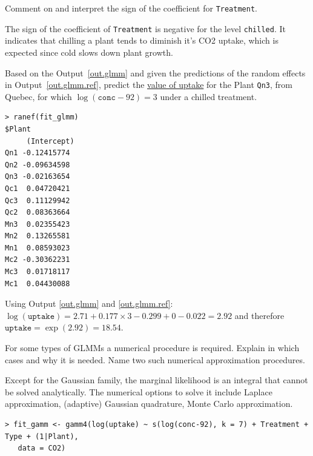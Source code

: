 \documentclass[11pt,a4paper%
addpoints, 
answers%
]{exam}
\begin{document}
\begin{questions}
\question[2] Comment on and interpret the sign of the coefficient for \texttt{Treatment}.

\begin{solution}
The sign of the coefficient of \texttt{Treatment} is negative for the level \texttt{chilled}. It indicates that chilling a plant tends to diminish it's CO2 uptake, which is expected since cold slows down plant growth. 
\end{solution}
\question[2] Based on the Output~\ref{out.glmm} and given the predictions of the random effects in Output~\ref{out.glmm.ref},  predict the \underline{value of uptake} for the Plant \texttt{Qn3}, from Quebec, for which $\log(\texttt{conc}-92) = 3$ under a chilled treatment. 

\newpage
\begin{center}
\begin{verbatim}
> ranef(fit_glmm)
$Plant
     (Intercept)
Qn1 -0.12415774
Qn2 -0.09634598
Qn3 -0.02163654
Qc1  0.04720421
Qc3  0.11129942
Qc2  0.08363664
Mn3  0.02355423
Mn2  0.13265581
Mn1  0.08593023
Mc2 -0.30362231
Mc3  0.01718117
Mc1  0.04430088
\end{verbatim}
\end{center}



\begin{solution}
Using Output \ref{out.glmm} and \ref{out.glmm.ref}: 
$\log(\texttt{uptake}) = 2.71 + 0.177 \times 3 - 0.299 + 0 - 0.022 = 2.92$
and therefore $\texttt{uptake} = \exp(2.92) = 18.54$.
\end{solution}

\question[2] For some types of GLMMs a numerical procedure is required.  Explain in which cases and why it is needed. Name two such numerical approximation procedures.
\begin{solution}
Except for the Gaussian family, the marginal likelihood is an integral that cannot be solved analytically. The numerical options to solve it include Laplace approximation, (adaptive) Gaussian quadrature, Monte Carlo approximation.
\end{solution}

 


\begin{center}
\begin{verbatim}	
> fit_gamm <- gamm4(log(uptake) ~ s(log(conc-92), k = 7) + Treatment + Type + (1|Plant), 
   data = CO2) 
   

\end{verbatim}
\end{center}
\end{questions}
\end{document}

